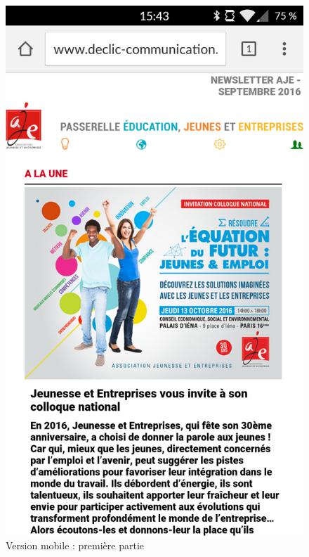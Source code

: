 \documentclass[report]{tnreport}
\begin{document}
\begin{figure}[!htb]
  \includegraphics[width=\linewidth]{figures/aje_mobile1}
  \caption{Version mobile : première partie}\label{fig:aje_mobile1}
\endminipage\hfill
{}

\end{figure}
\end{document}
